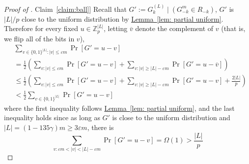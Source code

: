 \documentclass[11pt]{article}
\numberwithin{equation}{section}
\theoremstyle{definition}
\theoremstyle{plain}
\newcommand{\Z}{\mathbb Z}
\newcommand{\expref}[2]{\hyperref[#2]{#1~\ref{#2}}}
\newcommand{\cond}{\;|\;}
\newcommand{\zo}{\ensuremath{ \{ 0, 1 \} }}
\newcommand{\gap}{\ensuremath{\varepsilon}}
\newcommand{\bigomega}[1]{\ensuremath{{\Omega \left( {#1} \right)}}}
\newcommand{\eqdef}{\ensuremath{:=}}
\begin{document}
	\begin{proof}[Proof of \expref{Claim}{claim:ball}]
		Recall that $G'\eqdef  G_k^{(L)}\cond (G_{-k}^m \in R_{-k})$,
		$G'$ is $|L|/p$ close to the uniform distribution by \expref{Lemma}{lem: partial uniform}. 
		Therefore for every fixed $u\in \Z_p^{|L|}$, letting $\overline{v}$ denote the complement of $v$ {\color{black}(that is, we flip all of the bits in $v$)},
		\begin{align*}
			& \sum_{v\in\zo^{|L|}: |v|\le \gap m} \Pr\left[ G'=u-v \right]\\  
			&= \frac{1}{2}\left(\sum_{v:|v|\le \gap m}\Pr\left[G'=u-v\right]+\sum_{v:|v|\ge |L|-\gap m}\Pr\left[G'=u-\overline{v}\right]\right)\\
	 		&\le  \frac{1}{2}\left(\sum_{v:|v|\le \gap m}\Pr\left[G'=u-v\right]+\sum_{v:|v|\ge |L|-\gap m}\Pr\left[G'={u-v} \right]+\frac{2|L|}{p}\right)\\
	 		&<  \frac{1}{2}\sum_{v\in \zo^{|L|}}\Pr\left[G'={u-v} \right]
		\end{align*}
		where the first inequality follows \expref{Lemma}{lem: partial uniform},
		and the last inequality holds since as long as $G'$ is close to the uniform distribution and $|L|=(1-135\gamma)m\ge 3\gap m$, there is 
		\[\sum_{v:\gap m<|v|<|L|-\gap m}\Pr\left[G'={u-v} \right] = \bigomega{1}> \frac{|L|}{p}\]


\end{proof}
\end{document}

